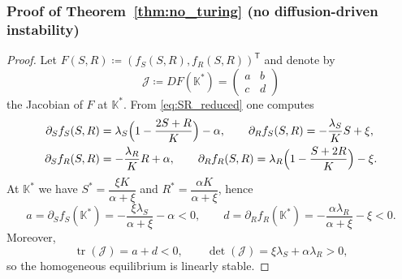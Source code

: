 \documentclass[pdflatex,sn-mathphys-ay]{sn-jnl}
\theoremstyle{thmstyleone}
\theoremstyle{definition}
\theoremstyle{remark}
\begin{document}
\subsubsection*{Proof of Theorem~\ref{thm:no_turing} (no diffusion-driven instability)}
\begin{proof}
Let $F(S,R)\coloneqq (f_S(S,R),f_R(S,R))^{\mathsf T}$ and denote by
\[
\mathcal{J}\coloneqq DF(\mathbb{K}^*)=
\begin{pmatrix}
a & b\\
c & d
\end{pmatrix}
\]
the Jacobian of $F$ at $\mathbb{K}^*$.
From \eqref{eq:SR_reduced} one computes
\begin{align}
\partial_S f_S(S,R) &= \lambda_S\Bigl(1-\frac{2S+R}{K}\Bigr)-\alpha,\qquad
\partial_R f_S(S,R)= -\frac{\lambda_S}{K}S+\xi,\nonumber\\
\partial_S f_R(S,R) &= -\frac{\lambda_R}{K}R+\alpha,\qquad
\partial_R f_R(S,R)= \lambda_R\Bigl(1-\frac{S+2R}{K}\Bigr)-\xi.
\label{eq:partials_SR_noturing}
\end{align}
At $\mathbb{K}^*$ we have $S^*=\dfrac{\xi K}{\alpha+\xi}$ and $R^*=\dfrac{\alpha K}{\alpha+\xi}$, hence
\begin{equation}
\label{eq:diag_signs_noturing}
a=\partial_S f_S(\mathbb{K}^*)=-\frac{\xi\lambda_S}{\alpha+\xi}-\alpha<0,
\qquad
d=\partial_R f_R(\mathbb{K}^*)=-\frac{\alpha\lambda_R}{\alpha+\xi}-\xi<0.
\end{equation}
Moreover,
\begin{equation}
\label{eq:tr_det_noturing}
\operatorname{tr}(\mathcal{J})=a+d<0,
\qquad
\det(\mathcal{J})=\xi\lambda_S+\alpha\lambda_R>0,
\end{equation}
so the homogeneous equilibrium is linearly stable.


\end{proof}
\end{document}
